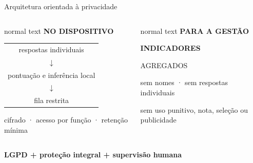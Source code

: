 \documentclass[aspectratio=169,11pt]{beamer}
\begin{document}
\begin{frame}{Arquitetura orientada à privacidade}
  \begin{columns}[c,onlytextwidth]
      \begin{beamercolorbox}[wd=\linewidth,sep=4mm,rounded=true]{normal text}
        \centering
        {\color{NeesWine}\bfseries NO DISPOSITIVO}\par\medskip
        \begin{tabular}{c}
          respostas individuais \\[1.5mm]
          $\downarrow$ \\[1mm]
          pontuação e inferência local \\[1.5mm]
          $\downarrow$ \\[1mm]
          fila restrita
        \end{tabular}\par\medskip
        {\scriptsize cifrado · acesso por função · retenção mínima}
      \end{beamercolorbox}
      \centering{\color{NeesRed}\Large$\Longrightarrow$}
      \begin{beamercolorbox}[wd=\linewidth,sep=4mm,rounded=true]{normal text}
        \centering
        {\color{NeesOrange}\bfseries PARA A GESTÃO}\par\medskip
        {\color{NeesDark}\Large\bfseries INDICADORES\par AGREGADOS}\par\medskip
        {\small sem nomes · sem respostas individuais}\par\smallskip
        {\small sem uso punitivo, nota, seleção ou publicidade}
      \end{beamercolorbox}
  \end{columns}
  \vfill
  \centering\color{NeesWine}\bfseries LGPD + proteção integral + supervisão humana
\end{frame}
\end{document}
